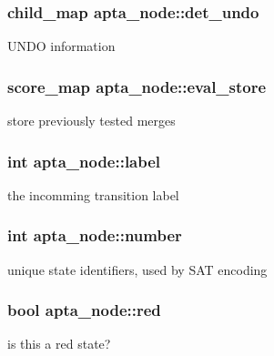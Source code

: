 \subsubsection[{\texorpdfstring{det\+\_\+undo}{det_undo}}]{\setlength{\rightskip}{0pt plus 5cm}child\+\_\+map apta\+\_\+node\+::det\+\_\+undo}\hypertarget{classapta__node_a73996ef299e0ed3fdef53b68f6dc2204}{}\label{classapta__node_a73996ef299e0ed3fdef53b68f6dc2204}
U\+N\+DO information 
\subsubsection[{\texorpdfstring{eval\+\_\+store}{eval_store}}]{\setlength{\rightskip}{0pt plus 5cm}score\+\_\+map apta\+\_\+node\+::eval\+\_\+store}\hypertarget{classapta__node_a61b271696a3f73cb1b5c74a303542522}{}\label{classapta__node_a61b271696a3f73cb1b5c74a303542522}
store previously tested merges 
\subsubsection[{\texorpdfstring{label}{label}}]{\setlength{\rightskip}{0pt plus 5cm}int apta\+\_\+node\+::label}\hypertarget{classapta__node_aaba8e9487f1161584177a708aa700bea}{}\label{classapta__node_aaba8e9487f1161584177a708aa700bea}
the incomming transition label 
\subsubsection[{\texorpdfstring{number}{number}}]{\setlength{\rightskip}{0pt plus 5cm}int apta\+\_\+node\+::number}\hypertarget{classapta__node_aa4d8ad2056671f1e14ddb4123ac6f87e}{}\label{classapta__node_aa4d8ad2056671f1e14ddb4123ac6f87e}
unique state identifiers, used by S\+AT encoding 
\subsubsection[{\texorpdfstring{red}{red}}]{\setlength{\rightskip}{0pt plus 5cm}bool apta\+\_\+node\+::red}\hypertarget{classapta__node_ab5e461390057947fba0c8ec64b7fd57a}{}\label{classapta__node_ab5e461390057947fba0c8ec64b7fd57a}
is this a red state? 
